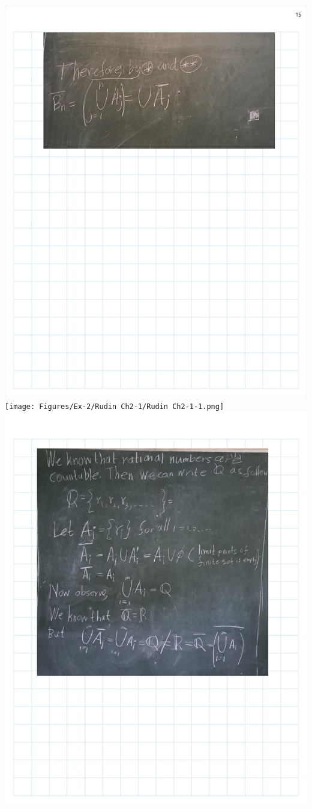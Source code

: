 \documentclass[
]{book}
\theoremstyle{definition}
\theoremstyle{definition}
\theoremstyle{definition}
\theoremstyle{definition}
\theoremstyle{remark}
\begin{document}
\includegraphics{Figures/Ex-2/Rudin Ch2-15.png}
\texttt{[image: Figures/Ex-2/Rudin Ch2-1/Rudin Ch2-1-1.png]}
\includegraphics{Figures/Ex-2/Rudin Ch2-1/Rudin Ch2-1-2.png}
\end{document}
